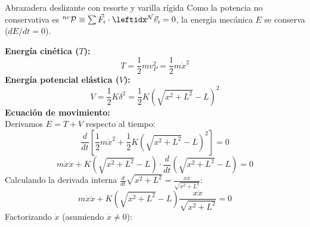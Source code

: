 \begin{solucion}{Abrazadera deslizante con resorte y varilla rígida}
Como la potencia no conservativa es ${}^{nc}\mathcal{P}\equiv\sum\vec{F}_i\cdot\marc{\vec{v}_i}{N}{}=0$, la energía mecánica $E$ se conserva ($dE/dt = 0$).

\textbf{Energía cinética ($T$):}
$$T = \frac{1}{2}m v_P^2 = \frac{1}{2}m\dot{x}^2$$
\textbf{Energía potencial elástica ($V$):}
$$V = \frac{1}{2}K\delta^2 = \frac{1}{2}K\left(\sqrt{x^2 + L^2} - L\right)^2$$
\textbf{Ecuación de movimiento:}\\
Derivamos $E = T + V$ respecto al tiempo:
$$\frac{d}{dt} \left[ \frac{1}{2}m\dot{x}^2 + \frac{1}{2}K\left(\sqrt{x^2 + L^2} - L\right)^2 \right] = 0$$
$$m\dot{x}\ddot{x} + K\left(\sqrt{x^2 + L^2} - L\right) \cdot \frac{d}{dt}\left(\sqrt{x^2 + L^2} - L\right) = 0$$
Calculando la derivada interna $\frac{d}{dt}\sqrt{x^2+L^2} = \frac{x\dot{x}}{\sqrt{x^2+L^2}}$:
$$m\dot{x}\ddot{x} + K\left(\sqrt{x^2 + L^2} - L\right) \frac{x\dot{x}}{\sqrt{x^2 + L^2}} = 0$$
Factorizando $\dot{x}$ (asumiendo $\dot{x} \neq 0$):

\end{solucion}
